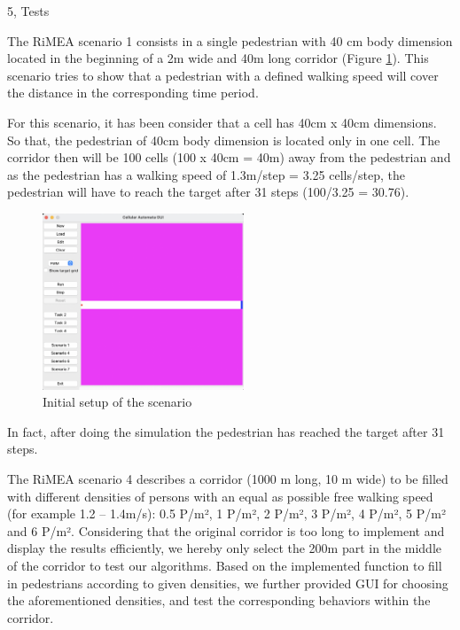 \documentclass[10pt,a4paper]{article}
\begin{document}
\begin{task}{5, Tests}


The RiMEA scenario 1 consists in a single pedestrian with 40 cm body dimension located in the beginning of a 2m wide and 40m long corridor (Figure \ref{fig10}). This scenario tries to show that a pedestrian with a defined walking speed will cover the distance in the corresponding time period.

For this scenario, it has been consider that a cell has 40cm x 40cm dimensions. So that, the pedestrian of 40cm body dimension is located only in one cell. The corridor then will be 100 cells (100 x 40cm = 40m) away from the pedestrian and as the pedestrian has a walking speed of 1.3m/step = 3.25 cells/step, the pedestrian will have to reach the target after 31 steps (100/3.25 = 30.76).

\begin{figure}[!h]
    \includegraphics[width=6cm]{test1_1}
    \centering
    \caption{Initial setup of the scenario}
    \label{fig10}
\end{figure}

In fact, after doing the simulation the pedestrian has reached the target after 31 steps.




The RiMEA scenario 4 describes a corridor (1000 m long, 10 m wide) to be filled with different densities 
of persons with an equal as possible free walking 
speed (for example 1.2 – 1.4m/s): 0.5 P/m², 1 P/m², 
2 P/m², 3 P/m², 4 P/m², 5 P/m² and 6 P/m². Considering that the original corridor is too long to implement and display the results efficiently, we hereby only select the 200m part in the middle of the corridor to test our algorithms. Based on the implemented function to fill in pedestrians according to given densities, we further provided GUI for choosing the aforementioned densities, and test the corresponding behaviors within the corridor. 


\end{task}
\end{document}
